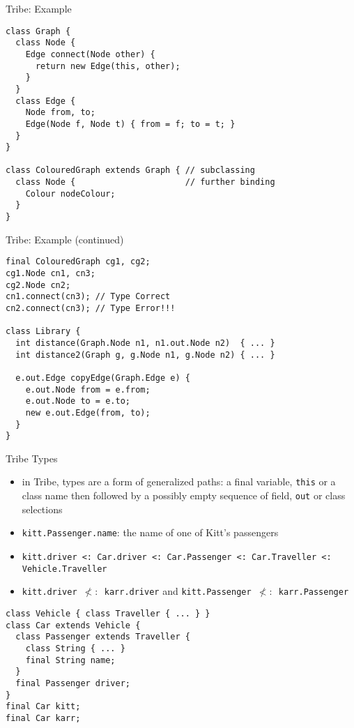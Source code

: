 \documentclass{beamer}
\begin{document}
\begin{frame}[fragile]{Tribe: Example}
\begin{verbatim}
class Graph {
  class Node {
    Edge connect(Node other) {
      return new Edge(this, other);
    }
  }
  class Edge {
    Node from, to;
    Edge(Node f, Node t) { from = f; to = t; }
  }
}

class ColouredGraph extends Graph { // subclassing
  class Node {                      // further binding
    Colour nodeColour;
  }
}
\end{verbatim}
\end{frame}

\begin{frame}[fragile]{Tribe: Example (continued)}
\begin{verbatim}
final ColouredGraph cg1, cg2;
cg1.Node cn1, cn3;
cg2.Node cn2;
cn1.connect(cn3); // Type Correct
cn2.connect(cn3); // Type Error!!!

class Library {
  int distance(Graph.Node n1, n1.out.Node n2)  { ... }
  int distance2(Graph g, g.Node n1, g.Node n2) { ... }

  e.out.Edge copyEdge(Graph.Edge e) {
    e.out.Node from = e.from;
    e.out.Node to = e.to;
    new e.out.Edge(from, to);
  }
}
\end{verbatim}
\end{frame}

\begin{frame}[fragile]{Tribe Types}
\begin{itemize}
\item in Tribe, types are a form of generalized paths: a final
  variable, {\tt this} or a class name then followed by a possibly
  empty sequence of field, {\tt out} or class selections
\item {\tt kitt.Passenger.name}: the name of one of Kitt's passengers
\item {\tt kitt.driver <: Car.driver <: Car.Passenger <: Car.Traveller <:
  Vehicle.Traveller}
\item {\tt kitt.driver $\not<:$ karr.driver} and {\tt kitt.Passenger $\not<:$ karr.Passenger}
\end{itemize}
\begin{verbatim}
class Vehicle { class Traveller { ... } }
class Car extends Vehicle {
  class Passenger extends Traveller {
    class String { ... }
    final String name;
  }
  final Passenger driver;
}
final Car kitt;
final Car karr;
\end{verbatim}
\end{frame}
\end{document}
